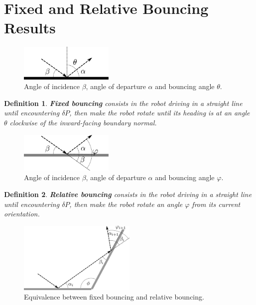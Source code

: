 \documentclass[10pt,a4paper]{article}
\newtheorem{definition}{\bf Definition}
\begin{document}
\section{Fixed and Relative Bouncing Results}

\begin{figure}[thpb]
  \centering
  \includegraphics[width=0.4\textwidth]{beTheAlp.pdf}
  \caption{Angle of incidence $\beta$, angle of departure $\alpha$ and bouncing angle $\theta$.}
  \label{fig:fixed_boun}
\end{figure}

\begin{definition}
\textbf{\emph{Fixed bouncing}} consists in the robot driving in a straight line until encountering $\delta P$, then make the robot rotate until its heading is at an angle $\theta$ clockwise of the inward-facing boundary normal.
 \end{definition}

\begin{figure}[thpb]
  \centering
  \includegraphics[width=0.4\textwidth]{beThePhi.pdf}
  \caption{Angle of incidence $\beta$, angle of departure $\alpha$ and bouncing angle $\varphi$.}
  \label{fig:relative_boun}
\end{figure}

\begin{definition}
\textbf{\emph{Relative bouncing}} consists in the robot driving in a straight line until encountering $\delta P$, then make the robot rotate an angle $\varphi$ from its current orientation.
 \end{definition} 

\begin{figure}[thpb]
  \centering
  \includegraphics[width=0.5\textwidth]{fixedRelativeEqui.pdf}
  \caption{Equivalence between fixed bouncing and relative bouncing.}
  \label{fig:equiv}
\end{figure}
\end{document}
